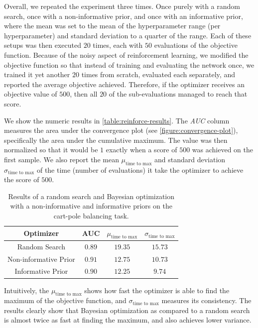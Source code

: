 Overall, we repeated the experiment three times. Once purely with a random
search, once with a non-informative prior, and once with an informative prior,
where the mean was set to the mean of the hyperparameter range (per
hyperparameter) and standard deviation to a quarter of the range. Each of these
setups was then executed $20$ times, each with $50$ evaluations of the
objective function. Because of the noisy aspect of reinforcement learning, we
modified the objective function so that instead of training and evaluating the
network once, we trained it yet another $20$ times from scratch, evaluated each
separately, and reported the average objective achieved. Therefore, if the
optimizer receives an objective value of $500$, then all $20$ of the
sub-evaluations managed to reach that score.

We show the numeric results in \autoref{table:reinforce-results}. The
\emph{AUC} column measures the area under the convergence plot (see
\autoref{figure:convergence-plot}), specifically the area under the cumulative
maximum. The value was then normalized so that it would be $1$ exactly when a
score of $500$ was achieved on the first sample. We also report the mean
$\mu_{\text{time to max}}$ and standard deviation $\sigma_{\text{time to max}}$
of the time (number of evaluations) it take the optimizer to achieve the score
of $500$.

\begin{table}[t]
	\begin{center}
		\begin{tabular}{||c c c c||} 
			\hline
			Optimizer & AUC & $\mu_{\text{time to max}}$ & $\sigma_{\text{time to max}}$ \\ [0.5ex] 
			\hline\hline
			Random Search & $0.89$ & $19.35$ & $15.73$ \\ 
			\hline
			Non-informative Prior & $0.91$ & $12.75$ & $10.73$ \\
			\hline
			Informative Prior & $0.90$ & $12.25$ & $9.74$  \\
			\hline
		\end{tabular}
		\caption{Results of a random search and Bayesian optimization with a non-informative and informative priors on the cart-pole balancing task.}
		\label{table:reinforce-results}
	\end{center}
\end{table}

Intuitively, the $\mu_{\text{time to max}}$ shows how fast the optimizer is
able to find the maximum of the objective function, and $\sigma_{\text{time to
max}}$ measures its consistency. The results clearly show that Bayesian
optimization as compared to a random search is almost twice as fast at finding
the maximum, and also achieves lower variance.

